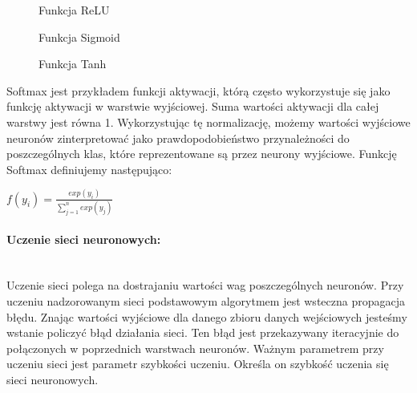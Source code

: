 \documentclass[a4paper,12pt,twoside,openany]{report}
\newcommand{\ImgPath}{.}
\begin{document}
\begin{figure}[H]
	\centering
		\caption{Funkcja ReLU}
\end{figure}

\begin{figure}[H]
	\centering
	\caption{Funkcja Sigmoid}
\end{figure}

\begin{figure}[H]
	\centering
	\caption{Funkcja Tanh}
\end{figure}

Softmax jest przykładem funkcji aktywacji, którą często wykorzystuje się jako funkcję aktywacji w warstwie wyjściowej. Suma wartości aktywacji dla całej warstwy jest równa 1. Wykorzystując tę normalizację, możemy wartości wyjściowe neuronów zinterpretować jako prawdopodobieństwo przynależności do poszczególnych klas, które reprezentowane są przez neurony wyjściowe. Funkcję Softmax definiujemy następująco: \\ 
\begin{center}
	{\LARGE $ f(y_{i}) = \frac{exp(y_{i})}
		{\sum_{j=1}^{n} exp(y_{j})}
	$\par}
\end{center}

\paragraph{Uczenie sieci neuronowych:}
\mbox{} \\
\indent
Uczenie sieci polega na dostrajaniu wartości wag poszczególnych neuronów. Przy uczeniu nadzorowanym sieci podstawowym algorytmem jest wsteczna propagacja błędu. Znając wartości wyjściowe dla danego zbioru danych wejściowych jesteśmy wstanie policzyć błąd działania sieci. Ten błąd jest przekazywany iteracyjnie do połączonych w poprzednich warstwach neuronów. Ważnym parametrem przy uczeniu sieci jest parametr szybkości uczeniu. Określa on szybkość uczenia się sieci neuronowych. 
\end{document}
